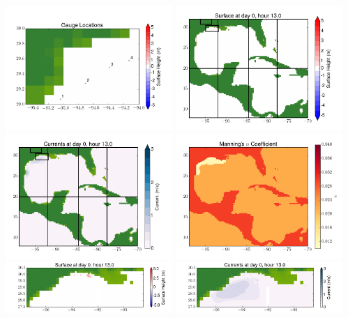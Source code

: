 \documentclass[11pt]{article}
\begin{document}
\includegraphics[width=0.475\textwidth]{frame0084fig10.png}
\vskip 10pt 
\includegraphics[width=0.475\textwidth]{frame0085fig1.png}
\includegraphics[width=0.475\textwidth]{frame0085fig2.png}
\vskip 10pt 
\includegraphics[width=0.475\textwidth]{frame0085fig3.png}
\includegraphics[width=0.475\textwidth]{frame0085fig4.png}
\vskip 10pt 
\includegraphics[width=0.475\textwidth]{frame0085fig5.png}
\end{document}
